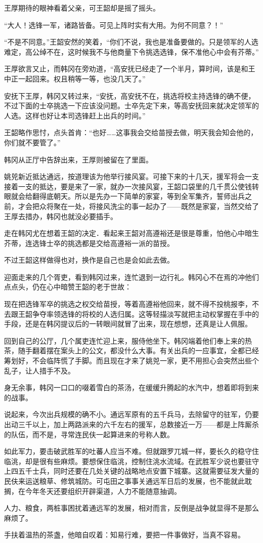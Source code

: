 王厚期待的眼神看着父亲，可王韶却是摇了摇头。

“大人！选锋一军，诸路皆备。可见上阵时实有大用。为何不同意？！”

“不是不同意。”王韶安然的笑着，“你们不说，我也是准备要做的。只是领军的人选难定，高公绰不在，这时候我不与他商量下令挑选选锋，保不准他心中会有芥蒂。”

王厚欲言又止，而韩冈在旁劝道，“高安抚已经走了一个半月，算时间，该是和王中正一起回来。权且稍等一等，也没几天了。”

安抚下王厚，韩冈又转过来，“安抚，高安抚不在，挑选将校主持选锋的确不便，不过下面的士卒挑选一下应该没问题。士卒先定下来，等高安抚回来就决定领军的人选。这样也好让本司选锋赶上出兵的时间。”

王韶略作思忖，点头首肯：“也好……这事我会交给苗授去做，明天我会知会他的，你们就不要管了。”

韩冈从正厅中告辞出来，王厚则被留在了里面。

姚兕新近抵达通远，按道理该为他举行接风宴。可接下来的十几天，援军将会一支接着一支的抵达，要是来了一家，就办一次接风宴，王韶口袋里的几千贯公使钱转眼就会给翻得底朝天。所以是先办一下简单的家宴，等到全军集齐，誓师出兵之前，才会把众将聚在一处，将接风洗尘的事一起办了——既然是家宴，当然交给了王厚去措办，韩冈也就没必要插手。

走在韩冈尤在想着王韶的决定．看起来王韶对高遵裕还是很是尊重，怕他心中暗生芥蒂，连选锋士卒的挑选都是交给高遵裕一派的苗授。

不过王韶这样做得也对，换作是自己也是会如此去做。

迎面走来的几个胥吏，看到韩冈过来，连忙退到一边行礼。韩冈心不在焉的冲他们点点头，仍在心中暗赞王韶的老于世故：

现在把选锋军卒的挑选之权交给苗授，等着高遵裕他回来，就不得不投桃报李，不去跟王韶争夺率领选锋的将校的人选归属。这等轻描淡写就把主动权掌握在手中的手段，还是在韩冈提议后的一转眼间就冒了出来，现在想想，还真是让人佩服。

回到自己的公厅，几个属吏连忙迎上来，服侍他坐下。韩冈端着他们奉上来的热茶，随手翻着摆在案头上的公文，都没什么大事。有关出兵的一应事宜，全都已经筹划好，不会临阵慌了手脚。而且现在才来了姚兕一家，更不用担心会突然出些个乱子，让人措手不及。

身无余事，韩冈一口口的啜着雪白的茶汤，在缓缓升腾起的水汽中，想着即将到来的战事。

说起来，今次出兵规模的确不小。通远军原有的五千兵马，去除留守的驻军，仍要出动三千以上，加上两路派来的六千左右的援军，总数接近一万——都是上阵厮杀的队伍，而不是，寻常连民伕一起算进来的号称人数。

如此军力，要击破武胜军的吐蕃人应当不难。但就跟罗兀城一样，要长久的稳守住临洮，却是很有些麻烦。要想保住临洮，控制住洮水流域。在武胜军少说也要驻守上四五千士兵，同时还要在几处关键的战略地点安置下城寨。这就需要征发大量的民伕来运送粮草、修筑城防。可屯田之事事关通远军日后的发展，也不能就此耽搁，在今年冬天还要组织开辟渠道，人力不能随意抽调。

人力、粮食，两桩事困扰着通远军的发展，相对而言，反倒是战争就显得不是那么麻烦了。

手扶着温热的茶盏，他暗自叹着：知易行难，要把一件事做好，当真不容易。

